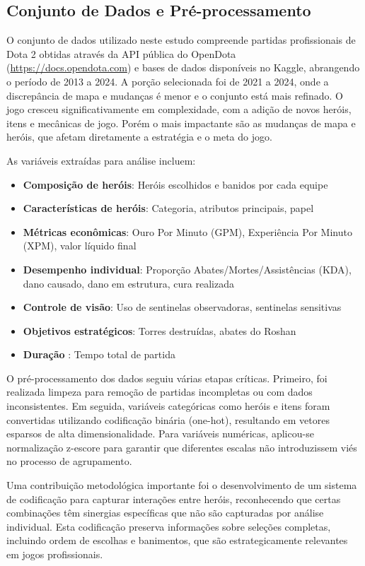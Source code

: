 \documentclass[12pt]{article}
\begin{document}
\subsection{Conjunto de Dados e Pré-processamento}

O conjunto de dados utilizado neste estudo compreende partidas profissionais de Dota 2 obtidas através da API pública do OpenDota (\url{https://docs.opendota.com}) e bases de dados disponíveis no Kaggle, abrangendo o período de 2013 a 2024. A porção selecionada foi de 2021 a 2024, onde a discrepância de mapa e mudanças é menor e o conjunto está mais refinado. O jogo cresceu significativamente em complexidade, com a adição de novos heróis, itens e mecânicas de jogo. Porém o mais impactante são as mudanças de mapa e heróis, que afetam diretamente a estratégia e o meta do jogo.

As variáveis extraídas para análise incluem:
\begin{itemize}
    \item \textbf{Composição de heróis}: Heróis escolhidos e banidos por cada equipe
    \item \textbf{Características de heróis}: Categoria, atributos principais, papel
    \item \textbf{Métricas econômicas}: Ouro Por Minuto (GPM), Experiência Por Minuto (XPM), valor líquido final
    \item \textbf{Desempenho individual}: Proporção Abates/Mortes/Assistências (KDA), dano causado, dano em estrutura, cura realizada
    \item \textbf{Controle de visão}: Uso de sentinelas observadoras, sentinelas sensitivas
    \item \textbf{Objetivos estratégicos}: Torres destruídas, abates do Roshan
    \item \textbf{Duração }: Tempo total de partida
\end{itemize}

O pré-processamento dos dados seguiu várias etapas críticas. Primeiro, foi realizada limpeza para remoção de partidas incompletas ou com dados inconsistentes. Em seguida, variáveis categóricas como heróis e itens foram convertidas utilizando codificação binária (one-hot), resultando em vetores esparsos de alta dimensionalidade. Para variáveis numéricas, aplicou-se normalização z-escore para garantir que diferentes escalas não introduzissem viés no processo de agrupamento.

Uma contribuição metodológica importante foi o desenvolvimento de um sistema de codificação para capturar interações entre heróis, reconhecendo que certas combinações têm sinergias específicas que não são capturadas por análise individual. Esta codificação preserva informações sobre seleções completas, incluindo ordem de escolhas e banimentos, que são estrategicamente relevantes em jogos profissionais.
\end{document}
